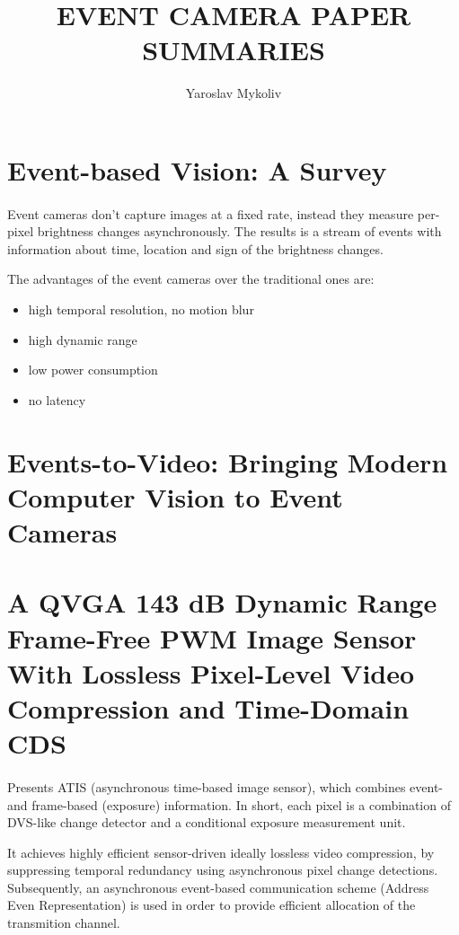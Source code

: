 \documentclass[10pt,a4paper]{article}
\author{Yaroslav Mykoliv}
\title{EVENT CAMERA PAPER SUMMARIES}
\begin{document}
\maketitle

\section{Event-based Vision: A Survey}
\paragraph{}
Event cameras don't capture images at a fixed rate, instead they measure per-pixel brightness changes asynchronously.
The results is a stream of events with information about time, location and sign of the brightness changes.

The advantages of the event cameras over the traditional ones are: 
\begin{itemize}
\item high temporal resolution, no motion blur
\item high dynamic range
\item low power consumption
\item no latency
\end{itemize}
\subsection{}

\section{Events-to-Video: Bringing Modern Computer Vision to Event Cameras}

\section{A QVGA 143 dB Dynamic Range Frame-Free PWM Image Sensor With Lossless Pixel-Level Video Compression and Time-Domain CDS}
\paragraph{}
Presents ATIS (asynchronous time-based image sensor), which combines event- and frame-based (exposure) information.
In short, each pixel is a combination of DVS-like change detector and a conditional exposure measurement unit.

It achieves highly efficient sensor-driven ideally lossless video compression, by suppressing temporal redundancy using asynchronous pixel change detections.
Subsequently, an asynchronous event-based communication scheme (Address Even Representation) is used in order to provide efficient allocation of the transmition channel.
\end{document}
